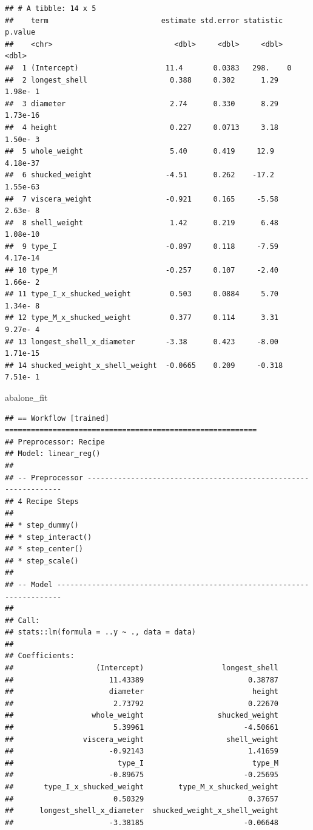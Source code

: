 \documentclass[
]{article}
\newenvironment{Shaded}{\begin{snugshade}}{\end{snugshade}}
\newcommand{\NormalTok}[1]{#1}
\begin{document}
\begin{verbatim}
## # A tibble: 14 x 5
##    term                          estimate std.error statistic  p.value
##    <chr>                            <dbl>     <dbl>     <dbl>    <dbl>
##  1 (Intercept)                    11.4       0.0383   298.    0       
##  2 longest_shell                   0.388     0.302      1.29  1.98e- 1
##  3 diameter                        2.74      0.330      8.29  1.73e-16
##  4 height                          0.227     0.0713     3.18  1.50e- 3
##  5 whole_weight                    5.40      0.419     12.9   4.18e-37
##  6 shucked_weight                 -4.51      0.262    -17.2   1.55e-63
##  7 viscera_weight                 -0.921     0.165     -5.58  2.63e- 8
##  8 shell_weight                    1.42      0.219      6.48  1.08e-10
##  9 type_I                         -0.897     0.118     -7.59  4.17e-14
## 10 type_M                         -0.257     0.107     -2.40  1.66e- 2
## 11 type_I_x_shucked_weight         0.503     0.0884     5.70  1.34e- 8
## 12 type_M_x_shucked_weight         0.377     0.114      3.31  9.27e- 4
## 13 longest_shell_x_diameter       -3.38      0.423     -8.00  1.71e-15
## 14 shucked_weight_x_shell_weight  -0.0665    0.209     -0.318 7.51e- 1
\end{verbatim}

\begin{Shaded}
\begin{Highlighting}[]
\NormalTok{abalone\_fit}
\end{Highlighting}
\end{Shaded}

\begin{verbatim}
## == Workflow [trained] ==========================================================
## Preprocessor: Recipe
## Model: linear_reg()
## 
## -- Preprocessor ----------------------------------------------------------------
## 4 Recipe Steps
## 
## * step_dummy()
## * step_interact()
## * step_center()
## * step_scale()
## 
## -- Model -----------------------------------------------------------------------
## 
## Call:
## stats::lm(formula = ..y ~ ., data = data)
## 
## Coefficients:
##                   (Intercept)                  longest_shell  
##                      11.43389                        0.38787  
##                      diameter                         height  
##                       2.73792                        0.22670  
##                  whole_weight                 shucked_weight  
##                       5.39961                       -4.50661  
##                viscera_weight                   shell_weight  
##                      -0.92143                        1.41659  
##                        type_I                         type_M  
##                      -0.89675                       -0.25695  
##       type_I_x_shucked_weight        type_M_x_shucked_weight  
##                       0.50329                        0.37657  
##      longest_shell_x_diameter  shucked_weight_x_shell_weight  
##                      -3.38185                       -0.06648
\end{verbatim}
\end{document}
